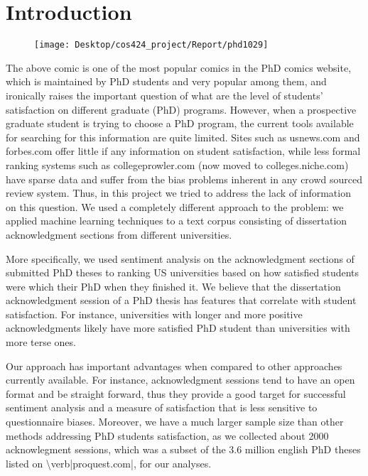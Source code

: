 \documentclass[english]{article}
\begin{document}
\section{Introduction}

\begin{figure}[H]
\texttt{[image: Desktop/cos424\_project/Report/phd1029]}
\end{figure}


The above comic is one of the most popular comics in the PhD comics
website, which is maintained by PhD students and very popular among
them, and ironically raises the important question of what are the
level of students' satisfaction on different graduate (PhD) programs.
However, when a prospective graduate student is trying to choose a
PhD program, the current tools available for searching for this information
are quite limited. Sites such as usnews.com and forbes.com offer little
if any information on student satisfaction, while less formal ranking
systems such as collegeprowler.com (now moved to colleges.niche.com)
have sparse data and suffer from the bias problems inherent in any
crowd sourced review system. Thus, in this project we tried to address
the lack of information on this question. We used a completely different
approach to the problem: we applied machine learning techniques to
a text corpus consisting of dissertation acknowledgment sections from
different universities. 

More specifically, we used sentiment analysis on the acknowledgment
sections of submitted PhD theses to ranking US universities based
on how satisfied students were which their PhD when they finished
it. We believe that the dissertation acknowledgment session of a PhD
thesis has features that correlate with student satisfaction. For
instance, universities with longer and more positive acknowledgments
likely have more satisfied PhD student than universities with more
terse ones.

Our approach has important advantages when compared to other approaches
currently available. For instance, acknowledgment sessions tend to
have an open format and be straight forward, thus they provide a good
target for successful sentiment analysis and a measure of satisfaction
that is less sensitive to questionnaire biases. Moreover, we have
a much larger sample size than other methods addressing PhD students
satisfaction, as we collected about 2000 acknowlegment sessions, which
was a subset of the 3.6 million english PhD theses listed on \textbackslash{}verb|proquest.com|,
for our analyses.
\end{document}
